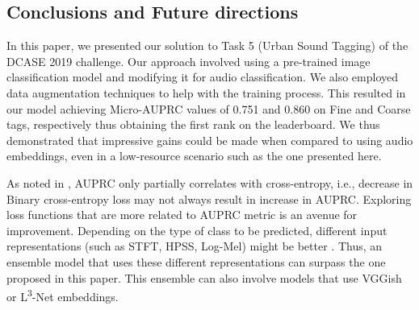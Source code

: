 \documentclass{article}
\begin{document}
\begin{sloppy}
\section{Conclusions and Future directions}
\label{sec:conclusions}

In this paper, we presented our solution to Task 5 (Urban Sound Tagging) of the DCASE 2019 challenge. Our approach involved using a pre-trained image classification model and modifying it for audio classification. We also employed data augmentation techniques to help with the training process. This resulted in our model achieving Micro-AUPRC values of 0.751 and 0.860 on Fine and Coarse tags, respectively thus obtaining the first rank on the leaderboard. We thus demonstrated that impressive gains could be made when compared to using audio embeddings, even in a low-resource scenario such as the one presented here.

As noted in \cite{Gousseau2019}, AUPRC only partially correlates with cross-entropy, i.e., decrease in Binary cross-entropy loss may not always result in increase in AUPRC. Exploring loss functions that are more related to AUPRC metric is an avenue for improvement. Depending on the type of class to be predicted, different input representations (such as STFT, HPSS, Log-Mel) might be better \cite{Bai2019}. Thus, an ensemble model that uses these different representations can surpass the one proposed in this paper. This ensemble can also involve models that use VGGish or L\textsuperscript{3}-Net embeddings.




\showthe\textwidth
\showthe\columnwidth
%
% 
%
%
%
% 
%
% 
% 


\end{sloppy}
\end{document}
